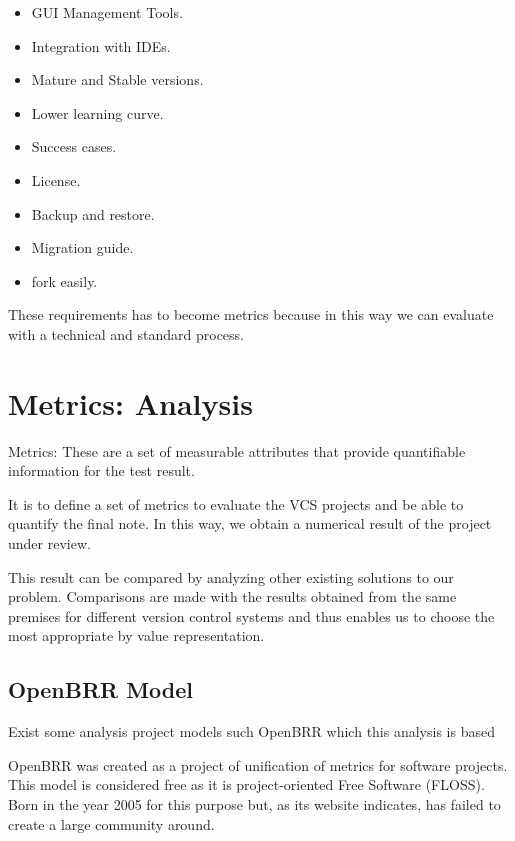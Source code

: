 \documentclass[11pt]{scrartcl}
\begin{document}
\begin{itemize}
    \item GUI Management Tools.
    \item Integration with IDEs.
    \item Mature and Stable versions.
    \item Lower learning curve.
    \item Success cases.
    \item License.
    \item Backup and restore.
    \item Migration guide.
    \item fork easily.
\end{itemize}

These requirements has to become metrics because in this way we can evaluate with a technical and standard process.

\section{Metrics: Analysis}

Metrics: These are a set of measurable attributes that provide quantifiable information for the test result.

\par It is to define a set of metrics to evaluate the VCS projects and be able to quantify the final note. In this way, we obtain a numerical result of the project under review.

\par This result can be compared by analyzing other existing solutions to our problem.
Comparisons are made with the results obtained from the same premises for different version control systems and thus enables us to choose the most appropriate by value representation.

\subsection{OpenBRR Model}

\par Exist some analysis project models such OpenBRR which this analysis is based

\par OpenBRR was created as a project of unification of metrics for software projects. This model is considered free as it is project-oriented Free Software (FLOSS). Born in the year 2005 for this purpose but, as its website indicates, has failed to create a large community around.
\end{document}
